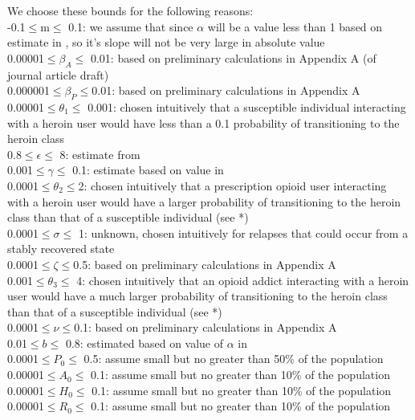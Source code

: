 \documentclass[12pt]{article}
\begin{document}
We choose these bounds for the following reasons: \\
-0.1$\leq$m$\leq$ 0.1: we assume that since $\alpha$ will be a value less than 1 based on estimate in \cite{Battista}, so it's slope will not be very large in absolute value \\
0.00001$\leq$$\beta_A$$\leq$ 0.01: based on preliminary calculations in Appendix A (of journal article draft) \\
0.000001$\leq$$\beta_P$$\leq$0.01: based on preliminary calculations in Appendix A \\
0.00001$\leq$$\theta_1$$\leq$ 0.001: chosen intuitively that a susceptible individual interacting with a heroin user would have less than a 0.1 probability of transitioning to the heroin class  \\
0.8$\leq$$\epsilon$$\leq$ 8: estimate from \cite{Battista} \\
0.001$\leq$$\gamma$$\leq$ 0.1: estimate based on value in \cite{Battista} \\
0.0001$\leq$$\theta_2$$\leq$2: chosen intuitively that a prescription opioid user interacting with a heroin user would have a larger probability of transitioning to the heroin class than that of a susceptible individual (see *) \cite{Muhuri}\\
0.0001$\leq$$\sigma$$\leq$ 1: unknown, chosen intuitively for relapses that could occur from a stably recovered state  \\
0.0001$\leq$$\zeta$$\leq$0.5: based on preliminary calculations in Appendix A\\
0.001$\leq$$\theta_3$$\leq$ 4: chosen intuitively that an opioid addict interacting with a heroin user would have a much larger probability of transitioning to the heroin class than that of a susceptible individual (see *) \cite{Muhuri}\\
0.0001$\leq$$\nu$$\leq$0.1: based on preliminary calculations in Appendix A \\
0.01$\leq$$b$$\leq$ 0.8: estimated based on value of $\alpha$ in \cite{Battista} \\
0.0001$\leq$$P_0$$\leq$ 0.5: assume small but no greater than 50\% of the population \\
0.00001$\leq$$A_0$$\leq$ 0.1: assume small but no greater than 10\% of the population \\
0.00001$\leq$$H_0$$\leq$ 0.1: assume small but no greater than 10\% of the population \\
0.00001$\leq$$R_0$$\leq$ 0.1: assume small but no greater than 10\% of the population \\
\end{document}
